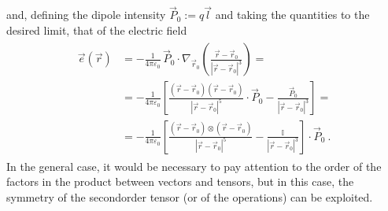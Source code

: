 \documentclass[letterpaper,10pt,english]{jupyterBook}
\begin{document}
\sphinxAtStartPar
and, defining the dipole intensity \(\vec{P}_0 := q \vec{l}\) and taking the quantities to the desired limit, that of the electric field
\begin{equation*}
\begin{split}\begin{aligned}
  \vec{e}(\vec{r})
  & = - \frac{1}{4\pi \varepsilon_0} \, \vec{P}_0 \cdot \nabla_{\vec{r}_0}  \left( \frac{\vec{r} - \vec{r}_0}{|\vec{r} - \vec{r}_0|^3} \right)   = \\
  & = - \frac{1}{4\pi \varepsilon_0} \left[ \frac{(\vec{r}-\vec{r}_0)(\vec{r}-\vec{r}_0)}{|\vec{r}-\vec{r}_0|^5} \cdot \vec{P}_0 - \frac{\vec{P}_0}{|\vec{r}-\vec{r}_0|^3} \right] = \\
  & = - \frac{1}{4\pi \varepsilon_0} \left[ \frac{(\vec{r}-\vec{r}_0) \otimes (\vec{r}-\vec{r}_0)}{|\vec{r}-\vec{r}_0|^5} - \frac{\mathbb{I}}{|\vec{r}-\vec{r}_0|^3} \right] \cdot \vec{P}_0 \ .
\end{aligned}\end{split}
\end{equation*}
\sphinxAtStartPar
{} In the general case, it would be necessary to pay attention to the order of the factors in the product between vectors and tensors, but in this case, the symmetry of the second\sphinxhyphen{}order tensor (or of the operations) can be exploited.
\end{document}
